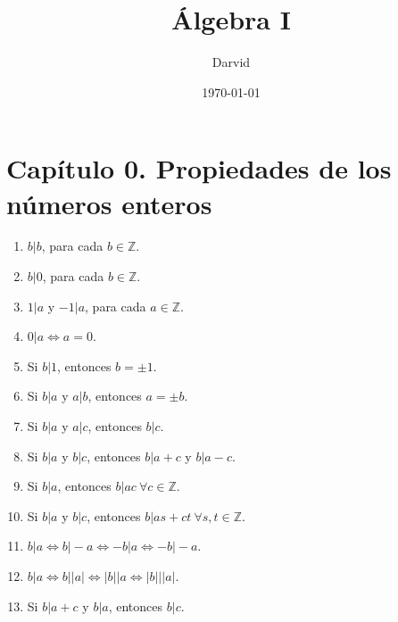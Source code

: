 \documentclass[11pt]{article}
\newcommand{\Z}{\mathbb{Z}}
\begin{document}
\title{Álgebra I}
\author{Darvid}
\date{\today}
\maketitle
\thispagestyle{empty}


\section{Capítulo 0. Propiedades de los números enteros}

\begin{enumerate}[label=P\arabic*.]
    \item $b|b$, para cada $b \in \Z$.
    \item $b|0$, para cada $b \in \Z$.
    \item $1|a$ y $-1|a$, para cada $a \in \Z$.
    \item $0|a \Longleftrightarrow a=0$.
    \item Si $b|1$, entonces $b=\pm 1$.
    \item Si $b|a$ y $a|b$, entonces $a=\pm b$.
    \item Si $b|a$ y $a|c$, entonces $b|c$.
    \item Si $b|a$ y $b|c$, entonces $b|a+c$ y $b|a-c$.
    \item Si $b|a$, entonces $b|ac \ \forall c \in \Z$.
    \item Si $b|a$ y $b|c$, entonces $b|as+ct \ \forall s,t \in \Z$.
    \item $b|a \Longleftrightarrow b|-a \Longleftrightarrow -b|a \Longleftrightarrow -b|-a$.
    \item $b|a \Longleftrightarrow b \Big||a| \Longleftrightarrow |b|\Big| a \Longleftrightarrow |b|\Big||a|$.
    \item Si $b|a+c$ y $b|a$, entonces $b|c$.
\end{enumerate}

\end{document}

